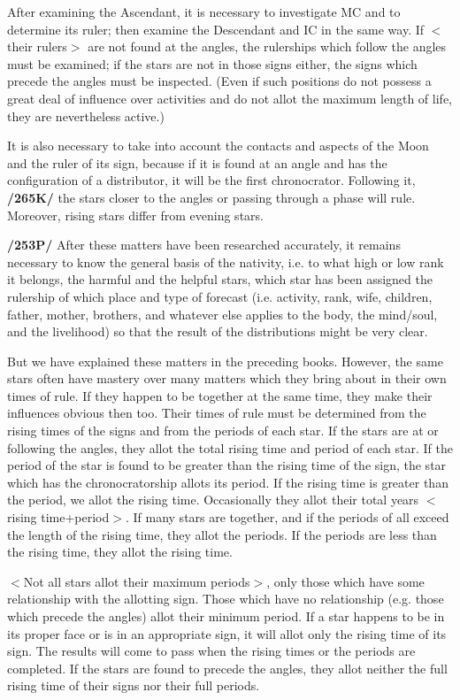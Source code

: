 After examining the Ascendant, it is necessary to investigate MC and to determine its ruler; then examine the Descendant and IC in the same way. If $<$their rulers$>$ are not found at the angles, the rulerships which follow the angles must be examined; if the stars are not in those signs either, the signs which precede the angles must be inspected. (Even if such positions do not possess a great deal of influence over activities and do not allot the maximum length of life, they are nevertheless active.) 

It is also necessary to take into account the contacts and aspects of the Moon and the ruler of its sign, because if it is found at an angle and has the configuration of a distributor, it will be the first chronocrator.
Following it, \textbf{/265K/} the stars closer to the angles or passing through a phase will rule. Moreover, rising stars differ from evening stars.

\textbf{/253P/} After these matters have been researched accurately, it remains necessary to know the general basis of the nativity, i.e. to what high or low rank it belongs, the harmful and the helpful stars, which star has been assigned the rulership of which place and type of forecast (i.e. activity, rank, wife, children, father, mother, brothers, and whatever else applies to the body, the mind/soul, and the livelihood) so that the result of the distributions might be very clear.

But we have explained these matters in the preceding books. However, the same stars often have mastery over many matters which they bring about in their own times of rule. If they happen to be together at the same time, they make their influences obvious then too. Their times of rule must be determined from the rising times of the signs and from the periods of each star. If the stars are at or following the angles, they allot the total rising time and period of each star. If the period of the star is found to be greater than the rising time of the sign, the star which has the chronocratorship allots its period. If the rising time
is greater than the period, we allot the rising time. Occasionally they allot their total years $<$rising time+period$>$. If many stars are together, and if the periods of all exceed the length of the rising time, they allot the periods. If the periods are less than the rising time, they allot the rising time. 

$<$Not all stars allot their maximum periods$>$, only those which have some relationship with the allotting sign. Those which have no relationship (e.g. those which precede the angles) allot their minimum period. If a star happens to be in its proper face or is in an appropriate sign, it will allot only the rising time of its sign. The results will come to pass when the rising times or the periods are completed. If the stars are found to precede the angles, they allot neither the full rising time of their signs nor their full periods.

